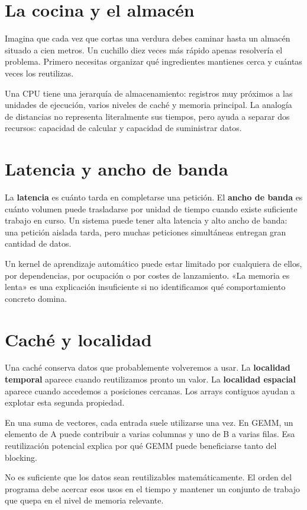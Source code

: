 \documentclass[12pt,a4paper,oneside]{report}
\begin{document}
\section{La cocina y el almacén}
Imagina que cada vez que cortas una verdura debes caminar hasta un almacén situado a cien metros. Un cuchillo diez veces más rápido apenas resolvería el problema. Primero necesitas organizar qué ingredientes mantienes cerca y cuántas veces los reutilizas.

Una CPU tiene una jerarquía de almacenamiento: registros muy próximos a las unidades de ejecución, varios niveles de caché y memoria principal. La analogía de distancias no representa literalmente sus tiempos, pero ayuda a separar dos recursos: capacidad de calcular y capacidad de suministrar datos.

\section{Latencia y ancho de banda}
La \textbf{latencia} es cuánto tarda en completarse una petición. El \textbf{ancho de banda} es cuánto volumen puede trasladarse por unidad de tiempo cuando existe suficiente trabajo en curso. Un sistema puede tener alta latencia y alto ancho de banda: una petición aislada tarda, pero muchas peticiones simultáneas entregan gran cantidad de datos.

Un kernel de aprendizaje automático puede estar limitado por cualquiera de ellos, por dependencias, por ocupación o por costes de lanzamiento. «La memoria es lenta» es una explicación insuficiente si no identificamos qué comportamiento concreto domina.

\section{Caché y localidad}
Una caché conserva datos que probablemente volveremos a usar. La \textbf{localidad temporal} aparece cuando reutilizamos pronto un valor. La \textbf{localidad espacial} aparece cuando accedemos a posiciones cercanas. Los arrays contiguos ayudan a explotar esta segunda propiedad.

En una suma de vectores, cada entrada suele utilizarse una vez. En GEMM, un elemento de A puede contribuir a varias columnas y uno de B a varias filas. Esa reutilización potencial explica por qué GEMM puede beneficiarse tanto del blocking.

No es suficiente que los datos sean reutilizables matemáticamente. El orden del programa debe acercar esos usos en el tiempo y mantener un conjunto de trabajo que quepa en el nivel de memoria relevante.
\end{document}
